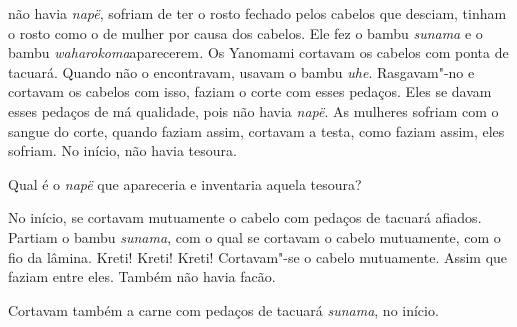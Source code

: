  

 não havia \emph{napë}, sofriam de ter o rosto fechado pelos
cabelos que desciam, tinham o rosto como o de mulher por causa dos
cabelos. Ele fez o bambu \emph{sunama} e o
bambu \emph{waharokoma}aparecerem\emph{.} Os Yanomami cortavam os
cabelos com ponta de tacuará. Quando não o encontravam, usavam o
bambu \emph{uhe}. Rasgavam"-no e cortavam os cabelos com isso, faziam o
corte com esses pedaços. Eles se davam esses pedaços de má qualidade,
pois não havia \emph{napë}. As mulheres sofriam com o sangue do corte,
quando faziam assim, cortavam a testa, como faziam assim, eles sofriam.
No início, não havia tesoura. 

Qual é o \emph{napë} que apareceria e inventaria aquela tesoura?

No início, se cortavam mutuamente o cabelo com pedaços de tacuará
afiados. Partiam o bambu \emph{sunama}, com o qual se cortavam o cabelo
mutuamente, com o fio da lâmina. Kreti! Kreti! Kreti! Cortavam"-se o
cabelo mutuamente. Assim que faziam entre eles. Também não havia facão. 

Cortavam também a carne com pedaços de tacuará \emph{sunama}, no início.

 
